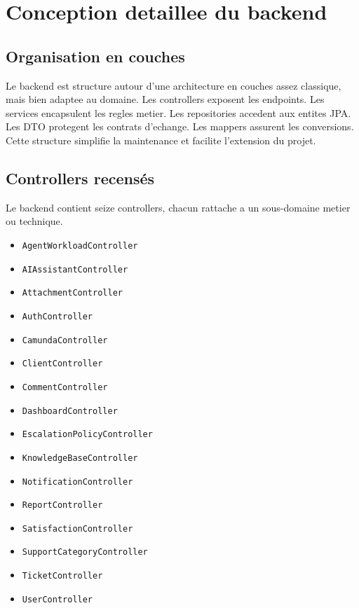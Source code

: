 \documentclass[12pt,a4paper,oneside]{report}
\begin{document}
\chapter{Conception detaillee du backend}

\section{Organisation en couches}

Le backend est structure autour d'une architecture en couches assez classique, mais bien adaptee au domaine. Les controllers exposent les endpoints. Les services encapsulent les regles metier. Les repositories accedent aux entites JPA. Les DTO protegent les contrats d'echange. Les mappers assurent les conversions. Cette structure simplifie la maintenance et facilite l'extension du projet.

\section{Controllers recensés}

Le backend contient seize controllers, chacun rattache a un sous-domaine metier ou technique.

\begin{itemize}[leftmargin=1.2cm]
  \item \texttt{AgentWorkloadController}
  \item \texttt{AIAssistantController}
  \item \texttt{AttachmentController}
  \item \texttt{AuthController}
  \item \texttt{CamundaController}
  \item \texttt{ClientController}
  \item \texttt{CommentController}
  \item \texttt{DashboardController}
  \item \texttt{EscalationPolicyController}
  \item \texttt{KnowledgeBaseController}
  \item \texttt{NotificationController}
  \item \texttt{ReportController}
  \item \texttt{SatisfactionController}
  \item \texttt{SupportCategoryController}
  \item \texttt{TicketController}
  \item \texttt{UserController}
\end{itemize}
\end{document}

